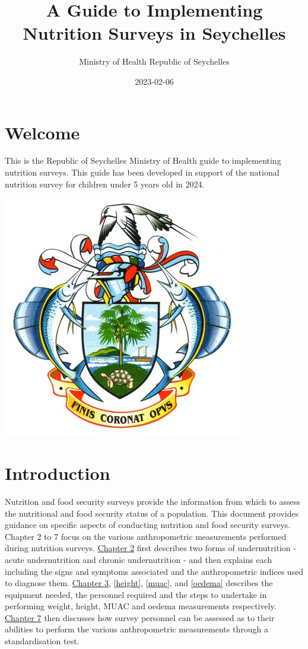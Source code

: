 \documentclass[
  12pt,
]{book}
\title{A Guide to Implementing Nutrition Surveys in Seychelles}
\author{Ministry of Health Republic of Seychelles}
\date{2023-02-06}
\begin{document}
\maketitle

{
\hypersetup{linkcolor=}
\setcounter{tocdepth}{1}
\tableofcontents
}
\hypertarget{welcome}{%
\chapter*{Welcome}\label{welcome}}

This is the Republic of Seychelles Ministry of Health guide to implementing nutrition surveys. This guide has been developed in support of the national nutrition survey for children under 5 years old in 2024.

\includegraphics{images/sc_moh.jpg}

\hypertarget{introduction}{%
\chapter{Introduction}\label{introduction}}

Nutrition and food security surveys provide the information from which to assess the nutritional and food security status of a population. This document provides guidance on specific aspects of conducting nutrition and food security surveys. Chapter 2 to 7 focus on the various anthropometric measurements performed during nutrition surveys. \protect\hyperlink{anthro}{Chapter 2} first describes two forms of undernutrition - acute undernutrition and chronic undernutrition - and then explains each including the signs and symptoms associated and the anthropometric indices used to diagnose them. \protect\hyperlink{weight}{Chapter 3}, \ref{height}, \ref{muac}, and \ref{oedema} describes the equipment needed, the personnel required and the steps to undertake in performing weight, height, MUAC and oedema measurements respectively. \protect\hyperlink{standard}{Chapter 7} then discusses how survey personnel can be assessed as to their abilities to perform the various anthropometric measurements through a standardisation test.
\end{document}
